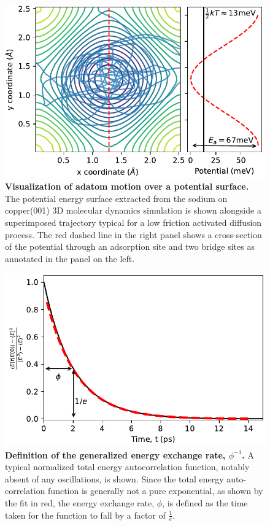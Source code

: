 \documentclass[7pt]{article}
\begin{document}
\begin{figure}
	\centering
	\includegraphics[width=1.0\columnwidth]{pot_surface}
	\caption{\textbf{Visualization of adatom motion over a potential surface.} The potential energy surface extracted from the sodium on copper(001) 3D molecular dynamics simulation is shown alongside a superimposed trajectory typical for a low friction activated diffusion process. The red dashed line in the right panel shows a cross-section of the potential through an adsorption site and two bridge sites as annotated in the panel on the left.}
	\label{fig:pot_surface}
\end{figure}

\begin{figure}
	\centering
	\includegraphics[width=1.0\columnwidth]{e_auto}
	\caption{\textbf{Definition of the generalized energy exchange rate, $\phi^{-1}$.} A typical normalized total energy autocorrelation function, notably absent of any oscillations, is shown. Since the total energy auto-correlation function is generally not a pure exponential, as shown by the fit in red, the energy exchange rate, $\phi$, is defined as the time taken for the function to fall by a factor of $\frac{1}{e}$.}
	\label{fig:e_auto}
\end{figure}
\end{document}
